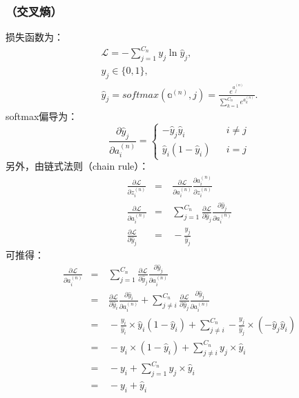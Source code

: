 \documentclass[letterpaper,10pt,english]{sphinxmanual}
\begin{document}
\subsubsection{ （交叉熵）}
\label{\detokenize{deepLearning/07_backprop:cross-entropy}}
损失函数为：
\begin{equation*}
\begin{split}\mathcal{L} = - \sum_{j=1}^{C_n} y_j \ln \hat{y}_j, \\
y_j \in \{ 0,1 \}, \\
\hat{y}_j = softmax(\mathbb{a}^{(n)}, j) = \frac{e^{a^{(n)}_j}}{\sum_{k=1}^{C_n} e^{a^{(n)}_k}}.\end{split}
\end{equation*}
softmax偏导为：
$$
\frac{\partial{\hat{y}_j}}{\partial{a^{(n)}_i}} =
\begin{cases}
   - \hat{y}_j \hat{y}_i & & i \ne j \\
   \hat{y}_i (1 - \hat{y}_i) & &  i = j
\end{cases}
$$
另外，由链式法则（chain rule）：
\begin{equation*}
\begin{split}\frac{\partial{\mathcal{L}}}{\partial{z^{(n)}_i}} & = & \  \frac{\partial{\mathcal{L}}}{\partial{a^{(n)}_i}} \frac{\partial{a^{(n)}_i}}{\partial{z^{(n)}_i}} \\
\frac{\partial{\mathcal{L}}}{\partial{a^{(n)}_i}} & = & \  \sum_{j=1}^{C_n} \frac{\partial{\mathcal{L}}}{\partial{\hat{y}_j}} \frac{\partial{\hat{y}_j}}{\partial{a^{(n)}_i}} \\
\frac{\partial{\mathcal{L}}}{\partial{\hat{y}_j}} & = & \  - \frac{y_j}{\hat{y}_j}\end{split}
\end{equation*}
可推得：
\begin{equation*}
\begin{split}\frac{\partial{\mathcal{L}}}{\partial{a^{(n)}_i}} & = & \  \sum_{j=1}^{C_n} \frac{\partial{\mathcal{L}}}{\partial{\hat{y}_j}} \frac{\partial{\hat{y}_j}}{\partial{a^{(n)}_i}} \\
                                                  & = & \  \frac{\partial{\mathcal{L}}}{\partial{\hat{y}_i}} \frac{\partial{\hat{y}_i}}{\partial{a^{(n)}_i}} + \sum_{j \ne i}^{C_n} \frac{\partial{\mathcal{L}}}{\partial{\hat{y}_j}} \frac{\partial{\hat{y}_j}}{\partial{a^{(n)}_i}} \\
                                                  & = & \  - \frac{y_i}{\hat{y}_i} \times \hat{y}_i (1 - \hat{y}_i) + \sum_{j \ne i}^{C_n} - \frac{y_j}{\hat{y}_j} \times \left ( - \hat{y}_j \hat{y}_i \right) \\
                                                  & = & \  - y_i \times (1 - \hat{y}_i) + \sum_{j \ne i}^{C_n}  y_j \times \hat{y}_i \\
                                                  & = & \  - y_i + \sum_{j=1}^{C_n}  y_j \times \hat{y}_i \\
                                                  & = & \  - y_i + \hat{y}_i\end{split}
\end{equation*}
\end{document}
